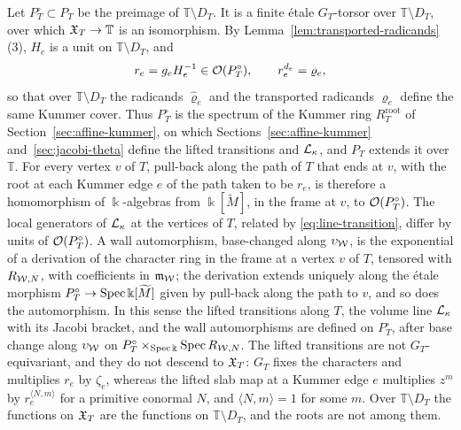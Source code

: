 Let $P_T^\circ\subset P_T$ be the preimage of $\mathbb T\setminus D_T$.  It is a
finite \'etale $G_T$-torsor over $\mathbb T\setminus D_T$, over which
$\mathfrak X_T\to\mathbb T$ is an isomorphism.  By
Lemma~\ref{lem:transported-radicands}(3), $H_e$ is a unit on
$\mathbb T\setminus D_T$, and
\[
 r_e=g_eH_e^{-1}\in\mathcal O(P_T^\circ),
 \qquad r_e^{d_e}=\varrho_e ,
\]
so that over $\mathbb T\setminus D_T$ the radicands $\widehat\varrho_e$ and the
transported radicands $\varrho_e$ define the same Kummer cover.  Thus $P_T^\circ$ is the
spectrum of the Kummer ring $R_T^{\mathrm{root}}$ of
Section~\ref{sec:affine-kummer}, on which Sections~\ref{sec:affine-kummer}
and~\ref{sec:jacobi-theta} define the lifted transitions and
$\mathcal L_\kappa$, and $P_T$ extends it over $\mathbb T$.  For every vertex $v$
of $T$, pull-back along the path of $T$ that ends at $v$, with the root at
each Kummer edge $e$ of the path taken to be $r_e$, is therefore a
homomorphism of $\Bbbk$-algebras from $\Bbbk[\widetilde M]$, in the frame
at $v$, to $\mathcal O(P_T^\circ)$.  The local generators of $\mathcal L_\kappa$ at
the vertices of $T$, related by \eqref{eq:line-transition}, differ by units of
$\mathcal O(P_T^\circ)$.  A wall automorphism, base-changed along
$\upsilon_\mathcal W$, is the exponential of a derivation of the character ring in
the frame at a vertex $v$ of $T$, tensored with $R_{\mathcal W,N}$, with
coefficients in $\mathfrak m_\mathcal W$; the derivation extends uniquely along the
\'etale morphism $P_T^\circ\to\operatorname{Spec}\Bbbk[\widetilde M]$ given by pull-back
along the path to $v$, and so does the automorphism.  In this sense the
lifted transitions along $T$, the volume line $\mathcal L_\kappa$ with its Jacobi
bracket, and the wall automorphisms are defined on $P_T^\circ$, after base
change along $\upsilon_\mathcal W$ on $P_T^\circ\times_{\operatorname{Spec}\Bbbk}\operatorname{Spec}
R_{\mathcal W,N}$.  The lifted transitions are not $G_T$-equivariant, and they
do not descend to $\mathfrak X_T$: $G_T$ fixes the characters and multiplies
$r_e$ by $\zeta_e$, whereas the lifted slab map at a Kummer edge
$e$ multiplies $z^m$ by $r_e^{\langle N,m\rangle}$ for a primitive
conormal $N$, and $\langle N,m\rangle=1$ for some $m$.  Over
$\mathbb T\setminus D_T$ the functions on $\mathfrak X_T$ are the functions on
$\mathbb T\setminus D_T$, and the roots are not among them.

